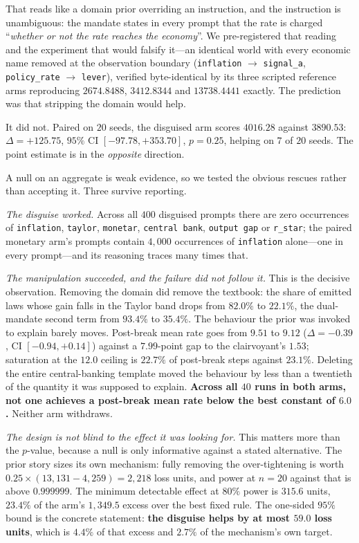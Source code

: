 \documentclass[11pt]{article}
\begin{document}
That reads like a domain prior overriding an instruction, and the instruction is unambiguous: the
mandate states in every prompt that the rate is charged ``\emph{whether or not the rate reaches the
economy}''. We pre-registered that reading and the experiment that would falsify it---an identical
world with every economic name removed at the observation boundary (\texttt{inflation}
$\to$ \texttt{signal\_a}, \texttt{policy\_rate} $\to$ \texttt{lever}), verified byte-identical by its
three scripted reference arms reproducing $2674.8488$, $3412.8344$ and $13738.4441$ exactly. The
prediction was that stripping the domain would help.

It did not. Paired on $20$ seeds, the disguised arm scores $4016.28$ against $3890.53$:
$\Delta = +125.75$, $95\%$ CI $[-97.78, +353.70]$, $p = 0.25$, helping on $7$ of $20$ seeds. The point
estimate is in the \emph{opposite} direction.

A null on an aggregate is weak evidence, so we tested the obvious rescues rather than accepting it.
Three survive reporting.

\emph{The disguise worked.} Across all $400$ disguised prompts there are zero occurrences of
\texttt{inflation}, \texttt{taylor}, \texttt{monetar}, \texttt{central bank}, \texttt{output gap} or
\texttt{r\_star}; the paired monetary arm's prompts contain $4{,}000$ occurrences of
\texttt{inflation} alone---one in every prompt---and its reasoning traces many times that.

\emph{The manipulation succeeded, and the failure did not follow it.} This is the decisive
observation. Removing the domain did remove the textbook: the share of emitted laws whose gain falls
in the Taylor band drops from $82.0\%$ to $22.1\%$, the dual-mandate second term from $93.4\%$ to
$35.4\%$. The behaviour the prior was invoked to explain barely moves. Post-break mean rate goes from
$9.51$ to $9.12$ ($\Delta = -0.39$, CI $[-0.94, +0.14]$) against a $7.99$-point gap to the
clairvoyant's $1.53$; saturation at the $12.0$ ceiling is $22.7\%$ of post-break steps against
$23.1\%$. Deleting the entire central-banking template moved the behaviour by less than a twentieth
of the quantity it was supposed to explain. \textbf{Across all $40$ runs in both arms, not one
achieves a post-break mean rate below the best constant of $6.0$.} Neither arm withdraws.

\emph{The design is not blind to the effect it was looking for.} This matters more than the $p$-value,
because a null is only informative against a stated alternative. The prior story sizes its own
mechanism: fully removing the over-tightening is worth $0.25 \times (13{,}131 - 4{,}259) = 2{,}218$ loss
units, and power at $n=20$ against that is above $0.999999$. The minimum detectable effect at $80\%$
power is $315.6$ units, $23.4\%$ of the arm's $1{,}349.5$ excess over the best fixed rule. The
one-sided $95\%$ bound is the concrete statement: \textbf{the disguise helps by at most $59.0$ loss
units}, which is $4.4\%$ of that excess and $2.7\%$ of the mechanism's own target.
\end{document}

